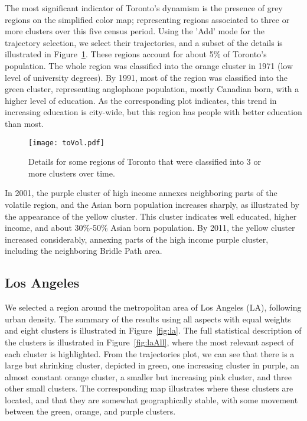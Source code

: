 The most significant indicator of Toronto's dynamism is the presence of grey
regions on the simplified color map; representing regions associated to three or
more clusters over this five census period. Using the 'Add' mode for the
trajectory selection, we select their trajectories, and a subset of the details
is illustrated in Figure~\ref{fig:toVol}. These regions account for about 5\% of
Toronto's population. The whole region was classified into the orange cluster in
1971 (low level of university degrees). By 1991, most of the region was
classified into the green cluster, representing anglophone population, mostly
Canadian born, with a higher level of education. As the corresponding plot
indicates, this trend in increasing education is city-wide, but this region has
people with better education than most.

\begin{figure}
    \centering 
    \texttt{[image: toVol.pdf]}
    \caption{Details for some regions of Toronto that were classified into 3 or
         more clusters over time.\label{fig:toVol}}
\end{figure}

In 2001, the purple cluster of high income annexes neighboring parts of the
volatile region, and the Asian born population increases sharply, as illustrated
by the appearance of the yellow cluster.  This cluster indicates well educated,
higher income, and about 30\%-50\% Asian born population. By 2011, the yellow
cluster increased considerably, annexing parts of the high income purple
cluster, including the neighboring Bridle Path area.


\subsection{Los Angeles}
We selected a region around the metropolitan area of Los Angeles (LA), following
urban density. The summary of the results using all aspects with equal weights
and eight clusters is illustrated in Figure~\ref{fig:la}. The full statistical
description of the clusters is illustrated in Figure~\ref{fig:laAll}, where the
most relevant aspect of each cluster is highlighted. From the trajectories plot,
we can see that there is a large but shrinking cluster, depicted in green, one
increasing cluster in purple, an almost constant orange cluster, a smaller but
increasing pink cluster, and three other small clusters. The corresponding map
illustrates where these clusters are located, and that they are somewhat
geographically stable, with some movement between the green, orange, and purple
clusters.

